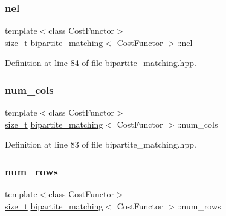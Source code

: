 \subsubsection{\texorpdfstring{nel}{nel}}
{\footnotesize\ttfamily template$<$class Cost\+Functor$>$ \\
\hyperlink{tutorial__fpt__2017_2intro_2sixth_2test_8c_a7c94ea6f8948649f8d181ae55911eeaf}{size\+\_\+t} \hyperlink{classbipartite__matching}{bipartite\+\_\+matching}$<$ Cost\+Functor $>$\+::nel\hspace{0.3cm}{\ttfamily [private]}}



Definition at line 84 of file bipartite\+\_\+matching.\+hpp.

\mbox{\label{classbipartite__matching_a208f537ced3b95da88175bc8003c5544}} 
\subsubsection{\texorpdfstring{num\+\_\+cols}{num\_cols}}
{\footnotesize\ttfamily template$<$class Cost\+Functor$>$ \\
\hyperlink{tutorial__fpt__2017_2intro_2sixth_2test_8c_a7c94ea6f8948649f8d181ae55911eeaf}{size\+\_\+t} \hyperlink{classbipartite__matching}{bipartite\+\_\+matching}$<$ Cost\+Functor $>$\+::num\+\_\+cols\hspace{0.3cm}{\ttfamily [private]}}



Definition at line 83 of file bipartite\+\_\+matching.\+hpp.

\mbox{\label{classbipartite__matching_a3a2831b4f5edd86f157fcf24e7ab2959}} 
\subsubsection{\texorpdfstring{num\+\_\+rows}{num\_rows}}
{\footnotesize\ttfamily template$<$class Cost\+Functor$>$ \\
\hyperlink{tutorial__fpt__2017_2intro_2sixth_2test_8c_a7c94ea6f8948649f8d181ae55911eeaf}{size\+\_\+t} \hyperlink{classbipartite__matching}{bipartite\+\_\+matching}$<$ Cost\+Functor $>$\+::num\+\_\+rows\hspace{0.3cm}{\ttfamily [private]}}



